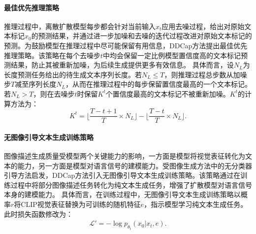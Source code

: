 \paragraph{最佳优先推理策略} 推理过程中，离散扩散模型每步都会针对当前输入$x_t$应用去噪过程，给出对原始文本标记$x_0$的预测结果，并通过进一步加噪和去噪的迭代过程改进对原始文本标记的预测。为鼓励模型在推理过程中尽可能保留有用信息，DDCap方法提出最佳优先推理策略。该策略在每个去噪步$t$中均会保留一定比例模型置信度高的文本标记预测结果，防止其被重新加噪，为后续生成提供更多有效信息。
具体而言，设$N_{L}$为长度预测任务给出的待生成文本序列长度。若$N_{L}\le T$，则推理过程总步数从加噪步$T$减至序列长度$N_{L}$，从而在推理过程中的每步保留置信度最高的一个文本标记。若$N_{L}>T$，则在去噪步$t$时保留$K^{t}$个置信度最高的文本标记不被重新加噪。$K^{t}$的计算方法为：
\begin{equation}
    K^{t} = \lfloor \frac{T-t+1}{T}\times N_{L}\rfloor-\lfloor \frac{T-t}{T}\times N_{L}\rfloor.
\end{equation}

\paragraph{无图像引导文本生成训练策略} 图像描述生成质量受模型两个关键能力的影响，一方面是模型将视觉表征转化为文本的能力，另一方面是模型对语言信号的建模能力。受图像生成方法中的无分类器引导方法\cite{glide, VQ-diffusion}启发，DDCap方法引入无图像引导文本生成训练策略。该策略通过在训练过程中将部分图像描述任务转化为纯文本生成任务，增强了扩散模型对语言信号本身的建模能力。
具体而言，在训练过程中，无图像引导文本生成训练策略以概率$r$将CLIP视觉表征替换为可训练的随机特征$e$，指示模型学习纯文本生成任务。此时损失函数修改为：
\begin{align}
    \mathcal{L}' = -\log p_{\theta_t}({x}_{0} | {x}_{t}, {e}).
\end{align}

